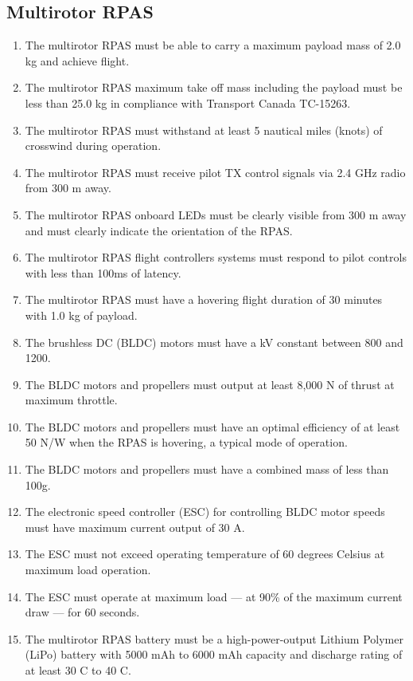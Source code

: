 \documentclass[10pt,letterpaper]{article}
\begin{document}
\subsection{Multirotor RPAS}
\begin{enumerate}[label=NF.DR.\arabic*, wide=1cm, widest=3cm, leftmargin=*, font=\bfseries, noitemsep,topsep=0pt, parsep=4pt, partopsep=0pt]
	\item The multirotor RPAS must be able to carry a maximum payload mass of 2.0 kg and achieve flight.
	\item The multirotor RPAS maximum take off mass including the payload must be less than 25.0 kg in compliance with Transport Canada TC-15263.\cite{tp15263}
	\item The multirotor RPAS must withstand at least 5 nautical miles (knots) of crosswind during operation.
	\item The multirotor RPAS must receive pilot TX control signals via 2.4 GHz radio from 300 m away.
	\item The multirotor RPAS onboard LEDs must be clearly visible from 300 m away and must clearly indicate the orientation of the RPAS.
	\item The multirotor RPAS flight controllers systems must respond to pilot controls with less than 100ms of latency.
	\item The multirotor RPAS must have a hovering flight duration of 30 minutes with 1.0 kg of payload.
	\item The brushless DC (BLDC) motors must have a kV constant between 800 and 1200.
	\item The BLDC motors and propellers must output at least 8,000 N of thrust at maximum throttle.
	\item The BLDC motors and propellers must have an optimal efficiency of at least 50 N/W when the RPAS is hovering, a typical mode of operation.
	\item The BLDC motors and propellers must have a combined mass of less than 100g.
	\item The electronic speed controller (ESC) for controlling BLDC motor speeds must have maximum current output of 30 A.
	\item The ESC must not exceed operating temperature of 60 degrees Celsius at maximum load operation.
	\item The ESC must operate at maximum load --- at 90\% of the maximum current draw --- for 60 seconds.
	\item The multirotor RPAS battery must be a high-power-output Lithium Polymer (LiPo) battery with 5000 mAh to 6000 mAh capacity and discharge rating of at least 30 C to 40 C.

\end{enumerate}
\end{document}
